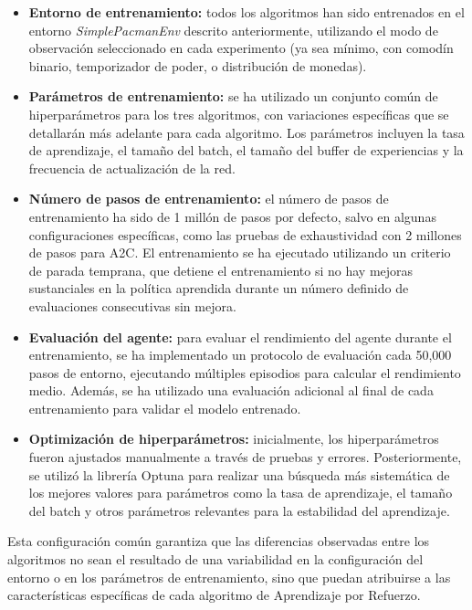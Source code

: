 \begin{itemize}
    \item \textbf{Entorno de entrenamiento:} todos los algoritmos han sido entrenados en el entorno \textit{SimplePacmanEnv} descrito anteriormente, utilizando el modo de observación seleccionado en cada experimento (ya sea mínimo, con comodín binario, temporizador de poder, o distribución de monedas).
    
    \item \textbf{Parámetros de entrenamiento:} se ha utilizado un conjunto común de hiperparámetros para los tres algoritmos, con variaciones específicas que se detallarán más adelante para cada algoritmo. Los parámetros incluyen la tasa de aprendizaje, el tamaño del batch, el tamaño del buffer de experiencias y la frecuencia de actualización de la red.
    
    \item \textbf{Número de pasos de entrenamiento:} el número de pasos de entrenamiento ha sido de 1 millón de pasos por defecto, salvo en algunas configuraciones específicas, como las pruebas de exhaustividad con 2 millones de pasos para A2C. El entrenamiento se ha ejecutado utilizando un criterio de parada temprana, que detiene el entrenamiento si no hay mejoras sustanciales en la política aprendida durante un número definido de evaluaciones consecutivas sin mejora.
    
    \item \textbf{Evaluación del agente:} para evaluar el rendimiento del agente durante el entrenamiento, se ha implementado un protocolo de evaluación cada 50,000 pasos de entorno, ejecutando múltiples episodios para calcular el rendimiento medio. Además, se ha utilizado una evaluación adicional al final de cada entrenamiento para validar el modelo entrenado.
    
    \item \textbf{Optimización de hiperparámetros:} inicialmente, los hiperparámetros fueron ajustados manualmente a través de pruebas y errores. Posteriormente, se utilizó la librería Optuna para realizar una búsqueda más sistemática de los mejores valores para parámetros como la tasa de aprendizaje, el tamaño del batch y otros parámetros relevantes para la estabilidad del aprendizaje.
\end{itemize}

Esta configuración común garantiza que las diferencias observadas entre los algoritmos no sean el resultado de una variabilidad en la configuración del entorno o en los parámetros de entrenamiento, sino que puedan atribuirse a las características específicas de cada algoritmo de Aprendizaje por Refuerzo.

